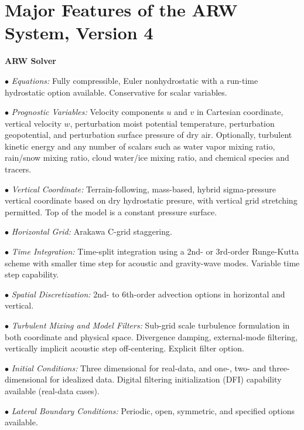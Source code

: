 \section {Major Features of the ARW System, Version 4}

\vskip 12pt
{\noindent\bf ARW Solver}
\vskip 12pt

\begin{description}
\setlength{\itemsep}{-5pt}
\item{$\bullet$} {\em Equations:}
Fully compressible, Euler nonhydrostatic with 
a run-time hydrostatic option available. Conservative for scalar variables.
%
\item{$\bullet$} {\em Prognostic Variables:}
Velocity components $u$ and $v$ in Cartesian coordinate, vertical velocity $w$, 
perturbation moist potential temperature, perturbation geopotential, 
and perturbation surface pressure of dry air.
Optionally, turbulent kinetic energy and any number of scalars
such as water vapor mixing ratio, rain/snow mixing ratio,
cloud water/ice mixing ratio, and chemical species and tracers.
%
\item{$\bullet$} {\em Vertical Coordinate:}
Terrain-following, mass-based, hybrid sigma-pressure vertical coordinate based on dry hydrostatic presure, 
with vertical grid stretching permitted.
Top of the model is a constant pressure surface.
%
\item{$\bullet$} {\em Horizontal Grid:}
Arakawa C-grid staggering. 
%
\item{$\bullet$} {\em Time Integration:}
Time-split integration using a 2nd- or 3rd-order Runge-Kutta scheme with
smaller time step for acoustic and gravity-wave modes. 
Variable time step capability.
%
\item{$\bullet$} {\em Spatial Discretization:}
2nd- to 6th-order advection options in horizontal and vertical.
%
\item{$\bullet$} {\em Turbulent Mixing and Model Filters:} Sub-grid scale
turbulence formulation in both coordinate and physical space.
Divergence damping, external-mode filtering, vertically implicit
acoustic step off-centering. Explicit filter option.
%
\item{$\bullet$} {\em Initial Conditions:}
Three dimensional for real-data, and one-, two- and 
three-dimensional for idealized data. 
Digital filtering initialization (DFI) capability 
available (real-data cases).
%
\item{$\bullet$} {\em Lateral Boundary Conditions:} 
Periodic, open, symmetric, and specified options available.
%

\end{description}

